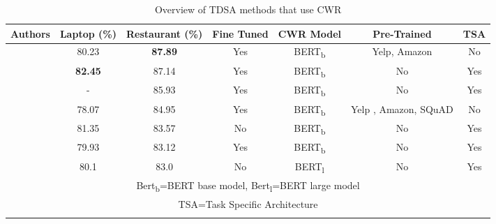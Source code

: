 \begin{longtable}{|c|c|c|c|c|c|c|}
\hline
Authors & Laptop (\%) & Restaurant (\%) & Fine Tuned &  CWR Model & Pre-Trained & TSA \\
\hline
\cite{rietzler2019adapt}   & 80.23 &  \textbf{87.89} &  Yes &  BERT\textsubscript{b} & Yelp, Amazon & No \\
\hline
\cite{zeng2019lcf}   & \textbf{82.45} &  87.14 &  Yes &  BERT\textsubscript{b} & No & Yes \\
\hline
\cite{jiang-etal-2019-challenge}   & - &  85.93 &  Yes &  BERT\textsubscript{b} & No & Yes \\
\hline
\cite{xu-etal-2019-bert}   & 78.07 & 84.95  &  Yes &  BERT\textsubscript{b} & Yelp , Amazon, SQuAD & No \\
\hline
\cite{zhao2019modeling}   & 81.35 &  83.57 &  No &  BERT\textsubscript{b} & No & Yes \\
\hline
\cite{song2019attentional}   & 79.93 &  83.12 &  Yes &  BERT\textsubscript{b} & No & Yes \\
\hline
\cite{huang-carley-2019-syntax}   & 80.1 &  83.0 &  No &  BERT\textsubscript{l} & No & Yes \\
\hline
\multicolumn{7}{|c|}{Bert\textsubscript{b}=BERT base model, Bert\textsubscript{l}=BERT large model \cite{aug_devlin-etal-2019-bert}} \\
\multicolumn{7}{|c|}{TSA=Task Specific Architecture} \\
\hline
\caption{Overview of TDSA methods that use CWR}
\label{table:aug_cwr_tdsa_cwr_methods_overview}
\end{longtable}